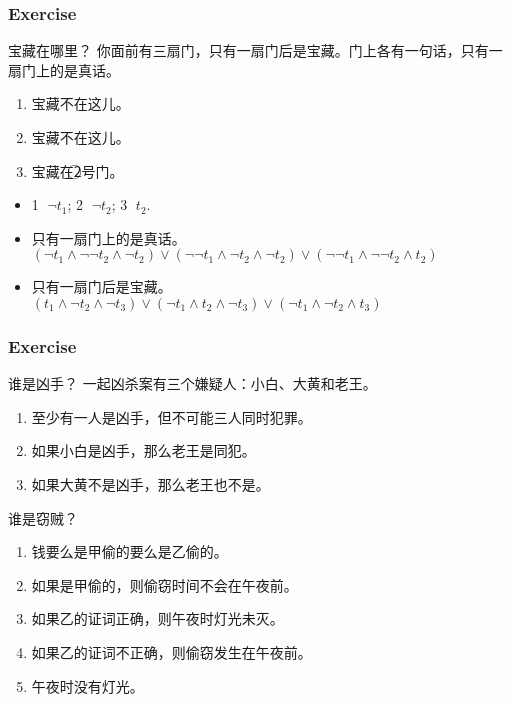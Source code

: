 \documentclass[UTF8,aspectratio=43,11pt,colorlinks,compress,openany]{beamer}%
\begin{document}
\begin{frame}\frametitle{Exercise}
\begin{block}{宝藏在哪里？}
你面前有三扇门，只有一扇门后是宝藏。门上各有一句话，只有一扇门上的是真话。
\begin{enumerate}
	\item 宝藏不在这儿。
	\item 宝藏不在这儿。
	\item 宝藏在\textcircled{\footnotesize 2}号门。
\end{enumerate}
\end{block}
\begin{itemize}
	\item \textcircled{\footnotesize 1} $\neg t_1$; \textcircled{\footnotesize 2} $\neg t_2$; \textcircled{\footnotesize 3} $t_2$.
	\item 只有一扇门上的是真话。
	$(\neg t_1\wedge\neg\neg t_2\wedge\neg t_2)\vee(\neg\neg t_1\wedge\neg t_2\wedge\neg t_2)\vee(\neg\neg t_1\wedge\neg\neg t_2\wedge t_2)$
	\item 只有一扇门后是宝藏。\\
	$(t_1\wedge\neg t_2\wedge\neg t_3)\vee(\neg t_1\wedge t_2\wedge\neg t_3)\vee(\neg t_1\wedge\neg t_2\wedge t_3)$
\end{itemize}
\end{frame}

\begin{frame}\frametitle{Exercise}
		\begin{block}{谁是凶手？}
			一起凶杀案有三个嫌疑人：小白、大黄和老王。
			\begin{enumerate}
				\item 至少有一人是凶手，但不可能三人同时犯罪。
				\item 如果小白是凶手，那么老王是同犯。
				\item 如果大黄不是凶手，那么老王也不是。
			\end{enumerate}
		\end{block}
		\begin{block}{谁是窃贼？}
			\begin{enumerate}
				\item 钱要么是甲偷的要么是乙偷的。
				\item 如果是甲偷的，则偷窃时间不会在午夜前。
				\item 如果乙的证词正确，则午夜时灯光未灭。
				\item 如果乙的证词不正确，则偷窃发生在午夜前。
				\item 午夜时没有灯光。
			\end{enumerate}
		\end{block}
\end{frame}
\end{document}
